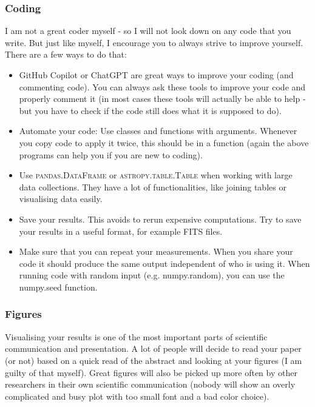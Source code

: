 \documentclass[fleqn,usenatbib]{mnras}
\begin{document}
\subsubsection{Coding}

I am not a great coder myself - so I will not look down on any code that you write. But just like myself, I encourage you to always strive to improve yourself. There are a few ways to do that:
\begin{itemize}
    \item GitHub Copilot or ChatGPT are great ways to improve your coding (and commenting code). You can always ask these tools to improve your code and properly comment it (in most cases these tools will actually be able to help - but you have to check if the code still does what it is supposed to do).
    \item Automate your code: Use classes and functions with arguments. Whenever you copy code to apply it twice, this should be in a function (again the above programs can help you if you are new to coding).
    \item Use \textsc{pandas.DataFrame} or \textsc{astropy.table.Table} when working with large data collections. They have a lot of functionalities, like joining tables or visualising data easily.
    \item Save your results. This avoids to rerun expensive computations. Try to save your results in a useful format, for example FITS files.
    \item Make sure that you can repeat your measurements. When you share your code it should produce the same output independent of who is using it. When running code with random input (e.g. numpy.random), you can use the numpy.seed function.
\end{itemize}

\subsubsection{Figures}

Visualising your results is one of the most important parts of scientific communication and presentation. A lot of people will decide to read your paper (or not) based on a quick read of the abstract and looking at your figures (I am guilty of that myself). Great figures will also be picked up more often by other researchers in their own scientific communication (nobody will show an overly complicated and busy plot with too small font and a bad color choice).
\end{document}
